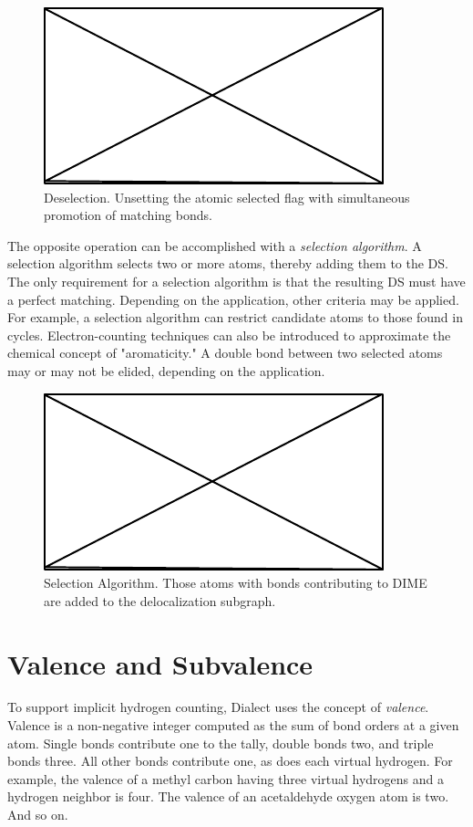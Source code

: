 \documentclass{article}
\begin{document}
\begin{figure}
    \centering
    \includegraphics{filler}
    \caption{Deselection. Unsetting the atomic selected flag with simultaneous promotion of matching bonds.}
    \label{fig:deselection}
\end{figure}

The opposite operation can be accomplished with a \textit{selection algorithm}. A selection algorithm selects two or more atoms, thereby adding them to the DS. The only requirement for a selection algorithm is that the resulting DS must have a perfect matching. Depending on the application, other criteria may be applied. For example, a selection algorithm can restrict candidate atoms to those found in cycles. Electron-counting techniques can also be introduced to approximate the chemical concept of "aromaticity." A double bond between two selected atoms may or may not be elided, depending on the application.

\begin{figure}
    \centering
    \includegraphics{filler}
    \caption{Selection Algorithm. Those atoms with bonds contributing to DIME are added to the delocalization subgraph.}
    \label{fig:selection}
\end{figure}

\section*{Valence and Subvalence}

To support implicit hydrogen counting, Dialect uses the concept of \textit{valence}. Valence is a non-negative integer computed as the sum of bond orders at a given atom. Single bonds contribute one to the tally, double bonds two, and triple bonds three. All other bonds contribute one, as does each virtual hydrogen. For example, the valence of a methyl carbon having three virtual hydrogens and a hydrogen neighbor is four. The valence of an acetaldehyde oxygen atom is two. And so on.
\end{document}

